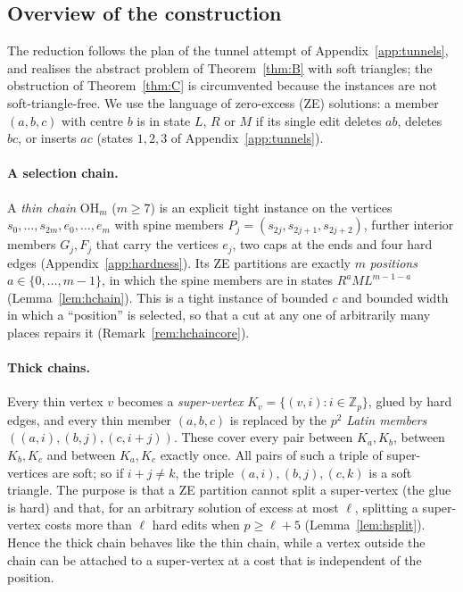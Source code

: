 \subsection{Overview of the construction}\label{sec:houtline}
The reduction follows the plan of the tunnel attempt of Appendix~\ref{app:tunnels}, and realises the abstract problem of Theorem~\ref{thm:B} with soft triangles; the obstruction of Theorem~\ref{thm:C} is circumvented because the instances are not soft-triangle-free. We use the language of zero-excess (ZE) solutions: a member $(a,b,c)$ with centre $b$ is in state $L$, $R$ or $M$ if its single edit deletes $ab$, deletes $bc$, or inserts $ac$ (states $1,2,3$ of Appendix~\ref{app:tunnels}).
\paragraph{A selection chain.} A \emph{thin chain} $\mathrm{OH}_m$ ($m\ge7$) is an explicit tight instance on the vertices $s_0,\dots,s_{2m},e_0,\dots,e_m$ with spine members $P_j=(s_{2j},s_{2j+1},s_{2j+2})$, further interior members $G_j,F_j$ that carry the vertices $e_j$, two caps at the ends and four hard edges (Appendix~\ref{app:hardness}). Its ZE partitions are exactly $m$ \emph{positions} $a\in\{0,\dots,m-1\}$, in which the spine members are in states $R^{a}ML^{m-1-a}$ (Lemma~\ref{lem:hchain}). This is a tight instance of bounded $c$ and bounded width in which a ``position'' is selected, so that a cut at any one of arbitrarily many places repairs it (Remark~\ref{rem:hchaincore}).

\paragraph{Thick chains.} Every thin vertex $v$ becomes a \emph{super-vertex} $K_v=\{(v,i):i\in\mathbb Z_p\}$, glued by hard edges, and every thin member $(a,b,c)$ is replaced by the $p^2$ \emph{Latin members} $((a,i),(b,j),(c,i+j))$. These cover every pair between $K_a,K_b$, between $K_b,K_c$ and between $K_a,K_c$ exactly once. All pairs of such a triple of super-vertices are soft; so if $i+j\ne k$, the triple $(a,i),(b,j),(c,k)$ is a soft triangle. The purpose is that a ZE partition cannot split a super-vertex (the glue is hard) and that, for an arbitrary solution of excess at most $\ell$, splitting a super-vertex costs more than $\ell$ hard edits when $p\ge\ell+5$ (Lemma~\ref{lem:hsplit}). Hence the thick chain behaves like the thin chain, while a vertex outside the chain can be attached to a super-vertex at a cost that is independent of the position.

